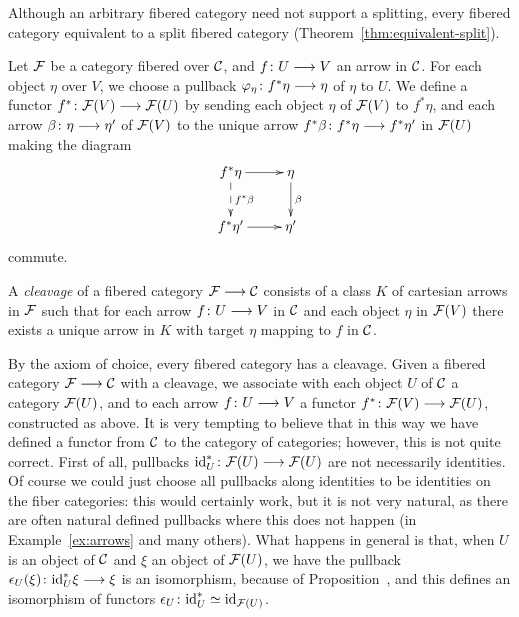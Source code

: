 \begin{3   FIBERED CATEGORIES}
\begin{3.1 Fibered categories}
\begin{shaded}
Although an arbitrary fibered category need not support a splitting, every fibered category equivalent to a split fibered category (Theorem~\ref{thm:equivalent-split}).
\end{shaded}


Let $\mathcal{F}$ be a category fibered over $\mathcal{C}$, and $f \colon U \arr V$ an arrow in $\mathcal{C}$. For each object $\eta$ over $V$, we choose a pullback $\phi_\eta \colon f^*\eta \arr \eta$ of $\eta$ to $U$. We define a functor $f^* \colon \cF(V) \arr \cF(U)$ by sending each object $\eta$ of $\mathcal{F}(V)$ to $f^*\eta $, and each arrow $\beta\colon \eta \arr \eta'$ of $\mathcal{F}(V)$ to the unique arrow $f^*\beta \colon f^*\eta \arr f^*\eta'$ in $\mathcal{F}(U)$ making the diagram
   \[
   \xymatrix{
   f^* \eta\ar[r]\ar@{-->}[d]^{f^* \beta}
   &{}\eta\ar[d]^\beta\\
   f^* \eta'\ar[r]&{}\eta'\\}
   \] commute.

\begin{definition}
A \emph{cleavage}%
 of a fibered category $\cF \arr \cC$ consists of a class $K$ of cartesian arrows in $\mathcal{F}$ such that for each arrow $f \colon U \arr V$ in $\mathcal{C}$ and each object $\eta$ in $\mathcal{F}(V)$ there exists a unique arrow in $K$ with target $\eta$ mapping to $f$ in $\mathcal{C}$.
\end{definition}

By the axiom of choice, every fibered category has a cleavage. Given a fibered category $\cF \arr \cC$ with a cleavage, we associate with each object $U$ of $\mathcal{C}$ a category $\mathcal{F}(U)$, and to each arrow $f \colon U \arr V$ a functor $f^* \colon \cF(V) \arr \cF(U)$, constructed as above. It is very tempting to believe that in this way we have defined a functor from $\mathcal{C}$ to the category of categories; however, this is not quite correct. First of all, pullbacks $\id_U^* \colon \cF(U) \arr \cF(U)$ are not necessarily identities. Of course we could just choose all pullbacks along identities to be identities on the fiber categories: this would certainly work, but it is not very natural, as there are often natural defined pullbacks where this does not happen (in Example~\ref{ex:arrows} and many others). What happens in general is that, when $U$ is an object of $\mathcal{C}$ and $\xi$ an object of $\mathcal{F}(U)$, we have the pullback $\isoiden_U(\xi)\colon\id_U^* \xi \arr \xi$ is an isomorphism, because of Proposition~, and this defines an isomorphism  of functors $\epsilon_U\colon \mathrm{id}_U^* \simeq \mathrm{id}_{\mathcal{F}(U)}$.


\end{3.1 Fibered categories}
\end{3   FIBERED CATEGORIES}
